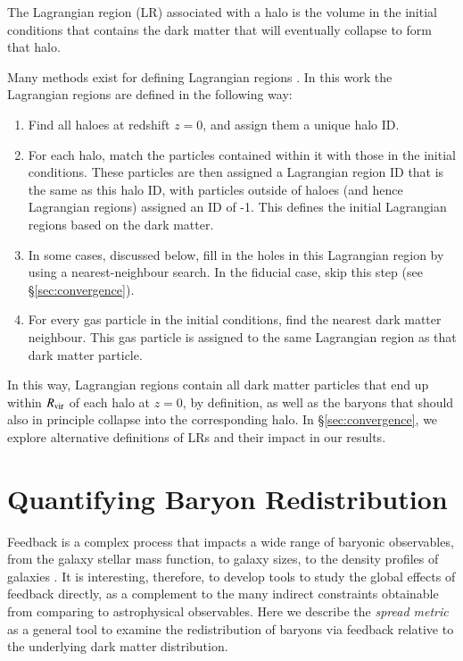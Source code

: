 \documentclass[fleqn,usenatbib]{mnras}
\begin{document}
The Lagrangian region (LR) associated with a halo is the volume in the initial conditions
that contains the dark matter that will eventually collapse to form that halo.

Many methods exist for defining Lagrangian regions \citep[see e.g. ][ for a
collection of methods]{Onorbe2014}. In this work the Lagrangian regions are
defined in the following way:
\begin{enumerate}
	\item Find all haloes at redshift $z=0$, and assign them a unique halo ID.

    \item For each halo, match the particles contained within it with those
		  in the initial conditions. These particles are then assigned a Lagrangian
		  region ID that is the same as this halo ID, with particles outside of haloes
		  (and hence Lagrangian regions) assigned an ID of -1. This defines the initial
		  Lagrangian regions based on the dark matter.

	\item In some cases, discussed below, fill in the holes in this Lagrangian
		  region by using a nearest-neighbour search. In the fiducial case, skip
		  this step (see \S \ref{sec:convergence}).

	\item For every gas particle in the initial conditions, find the nearest dark
	      matter neighbour. This gas particle is assigned to the same Lagrangian
	      region as that dark matter particle.
\end{enumerate}
In this way, Lagrangian regions contain all dark matter particles that end up
within $R_{\rm vir}$ of each halo at $z=0$, by definition, as well as the
baryons that should also in principle collapse into the corresponding halo.
In \S \ref{sec:convergence}, we explore alternative definitions of LRs and
their impact in our results. \section{Quantifying Baryon Redistribution}
\label{sec:feedbackmetrics}

Feedback is a complex process that impacts a wide range of baryonic
observables, from the galaxy stellar mass function, to galaxy sizes, to the
density profiles of galaxies \citep[e.g.][]{Angles-Alcazar2014, Nelson2015,
Hellwing2016, BenitezLlambay2018}. It is interesting, therefore, to develop
tools to study the global effects of feedback directly, as a complement to
the many indirect constraints obtainable from comparing to astrophysical
observables. Here we describe the {\it spread metric} as a general tool to
examine the redistribution of baryons via feedback relative to the underlying
dark matter distribution.
\end{document}
